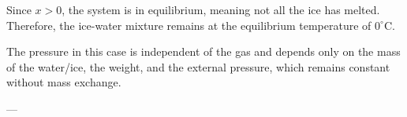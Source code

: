 Since \( x > 0 \), the system is in equilibrium, meaning not all the ice has melted. Therefore, the ice-water mixture remains at the equilibrium temperature of \( 0^\circ\text{C} \).  

The pressure in this case is independent of the gas and depends only on the mass of the water/ice, the weight, and the external pressure, which remains constant without mass exchange.  

---